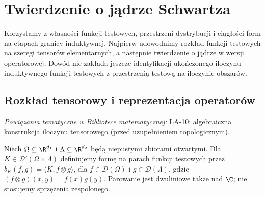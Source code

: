 \setcounter{section}{36}
\section{Twierdzenie o jądrze Schwartza}
\label{sec:dt-schwartz-kernel}
\providecommand{\atlasref}[2]{#2}

Korzystamy z własności funkcji testowych, przestrzeni
dystrybucji i ciągłości form na etapach granicy induktywnej.
Najpierw udowodnimy rozkład funkcji testowych na szeregi
tensorów elementarnych, a następnie twierdzenie o jądrze
w wersji operatorowej. Dowód nie zakłada jeszcze
identyfikacji ukończonego iloczynu induktywnego funkcji
testowych z przestrzenią testową na iloczynie obszarów.

\subsection{Rozkład tensorowy i reprezentacja operatorów}

\noindent\emph{Powiązania tematyczne w Bibliotece matematycznej:} \atlasref{LA-10::thm:lin10-istnienie}{LA-10: algebraiczna konstrukcja iloczynu tensorowego (przed uzupełnieniem topologicznym)}.


\begin{definicja}
\label{def:kernel-pair23}
Niech $\Omega\subseteq\R^{d_1}$ i
$\Lambda\subseteq\R^{d_2}$ będą niepustymi zbiorami otwartymi.
Dla $K\in\mathcal D'(\Omega\times\Lambda)$ definiujemy
formę na parach funkcji testowych przez
$b_K(f,g)=\langle K,f\otimes g\rangle$,
dla $f\in\mathcal D(\Omega)$ i $g\in\mathcal D(\Lambda)$,
gdzie $(f\otimes g)(x,y)=f(x)g(y)$.
Parowanie jest dwuliniowe także nad $\C$; nie stosujemy
sprzężenia zespolonego.
\end{definicja}

